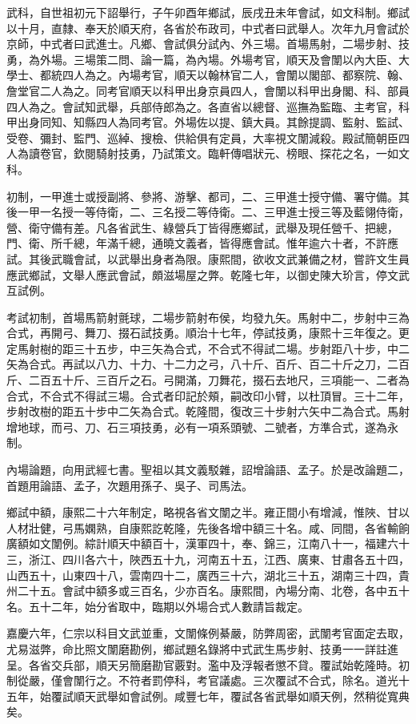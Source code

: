 \begin{pinyinscope}
武科，自世祖初元下詔舉行，子午卯酉年鄉試，辰戌丑未年會試，如文科制。鄉試以十月，直隸、奉天於順天府，各省於布政司，中式者曰武舉人。次年九月會試於京師，中式者曰武進士。凡鄉、會試俱分試內、外三場。首場馬射，二場步射、技勇，為外場。三場策二問、論一篇，為內場。外場考官，順天及會闈以內大臣、大學士、都統四人為之。內場考官，順天以翰林官二人，會闈以閣部、都察院、翰、詹堂官二人為之。同考官順天以科甲出身京員四人，會闈以科甲出身閣、科、部員四人為之。會試知武舉，兵部侍郎為之。各直省以總督、巡撫為監臨、主考官，科甲出身同知、知縣四人為同考官。外場佐以提、鎮大員。其餘提調、監射、監試、受卷、彌封、監門、巡綽、搜檢、供給俱有定員，大率視文闈減殺。殿試簡朝臣四人為讀卷官，欽閱騎射技勇，乃試策文。臨軒傳唱狀元、榜眼、探花之名，一如文科。

初制，一甲進士或授副將、參將、游擊、都司，二、三甲進士授守備、署守備。其後一甲一名授一等侍衛，二、三名授二等侍衛。二、三甲進士授三等及藍翎侍衛，營、衛守備有差。凡各省武生、綠營兵丁皆得應鄉試，武舉及現任營千、把總，門、衛、所千總，年滿千總，通曉文義者，皆得應會試。惟年逾六十者，不許應試。其後武職會試，以武舉出身者為限。康熙間，欲收文武兼備之材，嘗許文生員應武鄉試，文舉人應武會試，頗滋場屋之弊。乾隆七年，以御史陳大玠言，停文武互試例。

考試初制，首場馬箭射氈球，二場步箭射布侯，均發九矢。馬射中二，步射中三為合式，再開弓、舞刀、掇石試技勇。順治十七年，停試技勇，康熙十三年復之。更定馬射樹的距三十五步，中三矢為合式，不合式不得試二場。步射距八十步，中二矢為合式。再試以八力、十力、十二力之弓，八十斤、百斤、百二十斤之刀，二百斤、二百五十斤、三百斤之石。弓開滿，刀舞花，掇石去地尺，三項能一、二者為合式，不合式不得試三場。合式者印記於頰，嗣改印小臂，以杜頂冒。三十二年，步射改樹的距五十步中二矢為合式。乾隆間，復改三十步射六矢中二為合式。馬射增地球，而弓、刀、石三項技勇，必有一項系頭號、二號者，方準合式，遂為永制。

內場論題，向用武經七書。聖祖以其文義駁雜，詔增論語、孟子。於是改論題二，首題用論語、孟子，次題用孫子、吳子、司馬法。

鄉試中額，康熙二十六年制定，略視各省文闈之半。雍正間小有增減，惟陜、甘以人材壯健，弓馬嫻熟，自康熙訖乾隆，先後各增中額三十名。咸、同間，各省輸餉廣額如文闈例。綜計順天中額百十，漢軍四十，奉、錦三，江南八十一，福建六十三，浙江、四川各六十，陜西五十九，河南五十五，江西、廣東、甘肅各五十四，山西五十，山東四十八，雲南四十二，廣西三十六，湖北三十五，湖南三十四，貴州二十五。會試中額多或三百名，少亦百名。康熙間，內場分南、北卷，各中五十名。五十二年，始分省取中，臨期以外場合式人數請旨裁定。

嘉慶六年，仁宗以科目文武並重，文闈條例綦嚴，防弊周密，武闈考官面定去取，尤易滋弊，命比照文闈磨勘例，鄉試題名錄將中式武生馬步射、技勇一一詳註進呈。各省交兵部，順天另簡磨勘官覈對。濫中及浮報者懲不貸。覆試始乾隆時。初制從嚴，僅會闈行之。不符者罰停科，考官議處。三次覆試不合式，除名。道光十五年，始覆試順天武舉如會試例。咸豐七年，覆試各省武舉如順天例，然稍從寬典矣。


\end{pinyinscope}
